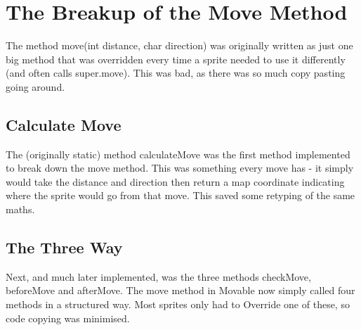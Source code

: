\documentclass{article}
\begin{document}
\section{The Breakup of the Move Method}
The method move(int distance, char direction) was originally written as just one big method that was overridden every time a sprite needed to use it differently (and often calls super.move). This was bad, as there was so much copy pasting going around.
\subsection{Calculate Move}
The (originally static) method calculateMove was the first method implemented to break down the move method. This was something every move has - it simply would take the distance and direction then return a map coordinate indicating where the sprite would go from that move. This saved some retyping of the same maths.
\subsection{The Three Way}
Next, and much later implemented, was the three methods checkMove, beforeMove and afterMove. The move method in Movable now simply called four methods in a structured way. Most sprites only had to Override one of these, so code copying was minimised.
\end{document}
